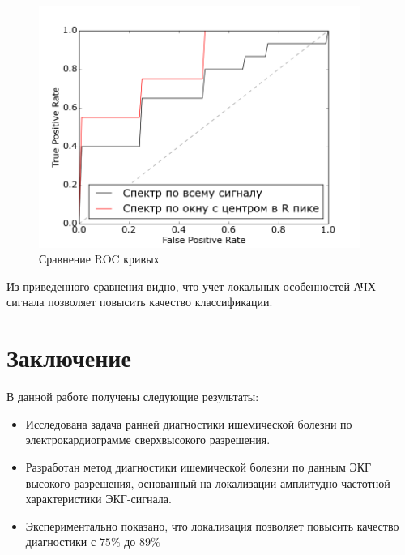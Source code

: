 \documentclass[a4paper,12pt]{extarticle}
\begin{document}
\begin{figure}[H]
    \begin{center}
        \includegraphics[width=105mm]{img/old_vs_new_roc.png}
    \end{center}
    \caption{Сравнение ROC кривых}
\end{figure}

Из приведенного сравнения видно, что учет локальных особенностей АЧХ сигнала позволяет повысить качество классификации.

\newpage

\section{Заключение}

В данной работе получены следующие результаты:
\begin{itemize}
    \item Исследована задача ранней диагностики ишемической болезни по электрокардиограмме сверхвысокого разрешения. 
    \item Разработан метод диагностики ишемической болезни по данным ЭКГ высокого разрешения, основанный на локализации амплитудно-частотной характеристики ЭКГ-сигнала. 
    \item Экспериментально показано, что локализация позволяет повысить качество диагностики с $75\%$ до $89\%$
\end{itemize}
\newpage

\end{document}
